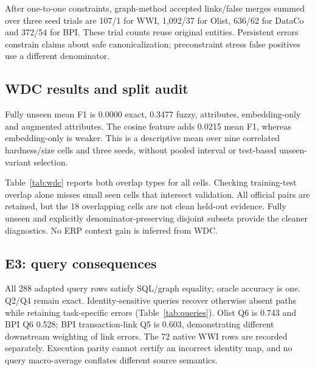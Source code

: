 \documentclass[conference,letterpaper]{IEEEtran}
\begin{document}
After one-to-one constraints, graph-method accepted links/false merges summed over three seed trials are 107/1 for WWI, 1,092/37 for Olist, 636/62 for DataCo and 372/54 for BPI. These trial counts reuse original entities. Persistent errors constrain claims about safe canonicalization; preconstraint stress false positives use a different denominator.

\subsection{WDC results and split audit}
Fully unseen mean F1 is 0.0000 exact, 0.3477 fuzzy, \WdcAttr{} attributes, \WdcEmb{} embedding-only and \WdcAug{} augmented attributes. The cosine feature adds 0.0215 mean F1, whereas embedding-only is weaker. This is a descriptive mean over nine correlated hardness/size cells and three seeds, without pooled interval or test-based unseen-variant selection.
\begin{table}[t]\centering\small\setlength{\tabcolsep}{5pt}
\caption{Every official WDC pairwise cell: hardness/unseen percentages; three-seed F1 means; distinct training-test and validation-test offer overlaps. Nonzero intersections flag contaminated official cells. Disjoint-subset metrics are separate diagnostics.}\label{tab:wdc}\end{table}
Table~\ref{tab:wdc} reports both overlap types for all cells. Checking training-test overlap alone misses small seen cells that intersect validation. All official pairs are retained, but the 18 overlapping cells are not clean held-out evidence. Fully unseen and explicitly denominator-preserving disjoint subsets provide the cleaner diagnostics. No ERP context gain is inferred from WDC.

\subsection{E3: query consequences}
\begin{table}[t]\centering\footnotesize
\caption{Mean predicted-identity answer-set F1. Q2/Q4 are local controls; all oracle results are nonempty. SQL/graph answers agree under every identity control.}\label{tab:queries}\end{table}
All 288 adapted query rows satisfy SQL/graph equality; oracle accuracy is one. Q2/Q4 remain exact. Identity-sensitive queries recover otherwise absent paths while retaining task-specific errors (Table~\ref{tab:queries}). Olist Q6 is 0.743 and BPI Q6 0.528; BPI transaction-link Q5 is 0.603, demonstrating different downstream weighting of link errors. The 72 native WWI rows are recorded separately. Execution parity cannot certify an incorrect identity map, and no query macro-average conflates different source semantics.
\end{document}
